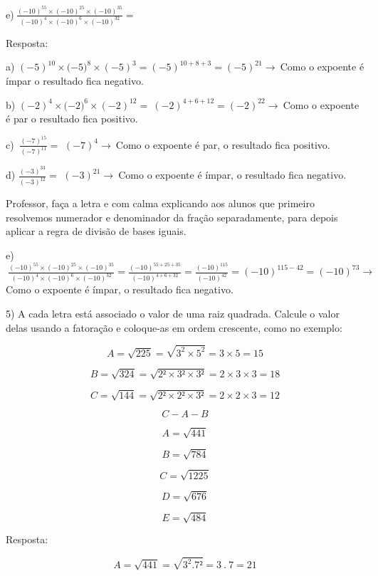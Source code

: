 {{e)\(\ \frac{{( - 10)}^{55} \times {( - 10)}^{25} \times {( - 10)}^{35}}{{( - 10)}^{4} \times {( - 10)}^{6} \times {( - 10)}^{32}} =\)

Resposta:

a)
\({( - 5)}^{10} \times ( - {5)}^{8} \times \left( - 5 \right)^{3} = \left( - 5 \right)^{10 + 8 + 3} = \left( - 5 \right)^{21} \rightarrow \ \)Como
o expoente é ímpar o resultado fica negativo.

b)
\({( - 2)}^{4} \times ( - {2)}^{6} \times \left( - 2 \right)^{12} = \ \left( - 2 \right)^{4 + 6 + 12} = \left( - 2 \right)^{22} \rightarrow \ \)Como
o expoente é par o resultado fica positivo.

c) \(\ \frac{{( - 7)}^{15}}{{( - 7)}^{11}} =\)
\({( - 7)}^{4} \rightarrow \ \)Como o expoente é par, o resultado fica
positivo.

d) \(\frac{{( - 3)}^{33}}{{( - 3)}^{12}} =\)
\({( - 3)}^{21} \rightarrow \ \)Como o expoente é ímpar, o resultado
fica negativo.

Professor, faça a letra e com calma explicando aos alunos que primeiro
resolvemos numerador e denominador da fração separadamente, para depois
aplicar a regra de divisão de bases iguais.

e)\(\ \frac{{( - 10)}^{55} \times {( - 10)}^{25} \times {( - 10)}^{35}}{{( - 10)}^{4} \times {( - 10)}^{6} \times {( - 10)}^{32}} = \frac{{( - 10)}^{55 + 25 + 35}}{{( - 10)}^{4 + 6 + 32}} = \frac{{( - 10)}^{115}}{{( - 10)}^{42}} = {( - 10)}^{115 - 42} = {( - 10)}^{73} \rightarrow \ \)Como
o expoente é ímpar, o resultado fica negativo.

5) A cada letra está associado o valor de uma raiz quadrada. Calcule o
valor delas usando a fatoração e coloque-as em ordem crescente, como no
exemplo:

\[A = \sqrt{225} = \sqrt{3^{2} \times 5^{2}} = 3 \times 5 = 15\]

\[B = \sqrt{324} = \sqrt{2² \times 3² \times 3²} = 2 \times 3 \times 3 = 18\]

\[C = \sqrt{144} = \sqrt{2² \times 2² \times 3²} = 2 \times 2 \times 3 = 12\]

\[C - A - B\]

\[A = \sqrt{441}\]

\[B = \sqrt{784}\]

\[C = \sqrt{1225}\]

\[D = \sqrt{676}\]

\[E = \sqrt{484}\]

Resposta:

\[A = \sqrt{441} = \sqrt{3^{2}.7²} = 3\ .\ 7 = 21\]

}}
